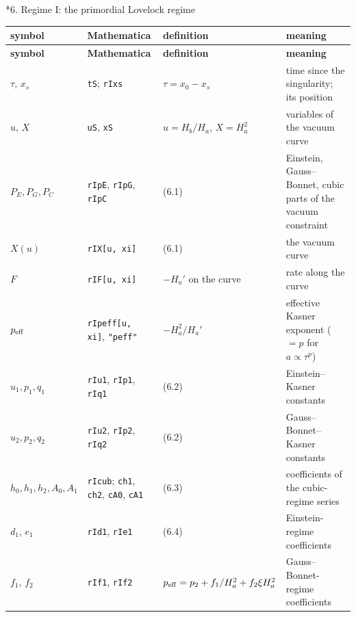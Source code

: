 \documentclass[10pt,a4paper]{article}
\makeatletter
\renewcommand\section{\@startsection{section}{1}{\z@}{-3.5ex \@plus -1ex \@minus -.2ex}{2.3ex \@plus.2ex}{\normalfont\Large\bfseries\raggedright}}
\makeatother
\begin{document}
\section*{6. Regime I: the primordial Lovelock regime}
{\small
\begin{longtable}{>{\raggedright\arraybackslash}p{}>{\raggedright\arraybackslash}p{}>{\raggedright\arraybackslash}p{}>{\raggedright\arraybackslash}p{}}
\toprule
\textbf{symbol} & \textbf{Mathematica} & \textbf{definition} & \textbf{meaning} \\
\midrule\endfirsthead
\toprule
\textbf{symbol} & \textbf{Mathematica} & \textbf{definition} & \textbf{meaning} \\
\midrule\endhead
\endfoot
\bottomrule\endlastfoot
$\tau$, $x_s$ & \texttt{tS}; \texttt{rIxs} & $\tau=x_0-x_s$ & time since the singularity; its position \\
$u$, $X$ & \texttt{uS}, \texttt{xS} & $u=H_b/H_a$, $X=H_a^2$ & variables of the vacuum curve \\
$P_E,P_G,P_C$ & \texttt{rIpE}, \texttt{rIpG}, \texttt{rIpC} & (6.1) & Einstein, Gauss–Bonnet, cubic parts of the vacuum constraint \\
$X(u)$ & \texttt{rIX[u, xi]} & (6.1) & the vacuum curve \\
$F$ & \texttt{rIF[u, xi]} & $-H_a'$ on the curve & rate along the curve \\
$p_{\rm eff}$ & \texttt{rIpeff[u, xi]}, \texttt{"peff"} & $-H_a^2/H_a'$ & effective Kasner exponent ($=p$ for $a\propto\tau^p$) \\
$u_1,p_1,q_1$ & \texttt{rIu1}, \texttt{rIp1}, \texttt{rIq1} & (6.2) & Einstein–Kasner constants \\
$u_2,p_2,q_2$ & \texttt{rIu2}, \texttt{rIp2}, \texttt{rIq2} & (6.2) & Gauss–Bonnet–Kasner constants \\
$h_0,h_1,h_2,A_0,A_1$ & \texttt{rIcub}; \texttt{ch1}, \texttt{ch2}, \texttt{cA0}, \texttt{cA1} & (6.3) & coefficients of the cubic-regime series \\
$d_1$, $e_1$ & \texttt{rId1}, \texttt{rIe1} & (6.4) & Einstein-regime coefficients \\
$f_1$, $f_2$ & \texttt{rIf1}, \texttt{rIf2} & $p_{\rm eff}=p_2+f_1/H_a^2+f_2\xi H_a^2$ & Gauss–Bonnet-regime coefficients \\

\end{longtable}}
\end{document}

